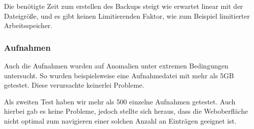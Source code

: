 Die benötigte Zeit zum erstellen des Backups steigt wie erwartet linear mit der Dateigröße, und es gibt keinen Limitierenden Faktor, wie zum Beispiel limitierter Arbeitsspeicher.

\subsubsection{Aufnahmen}
Auch die Aufnahmen wurden auf Anomalien unter extremen Bedingungen untersucht.\newline 
So wurden beispielsweise eine Aufnahmedatei mit mehr als 5GB getestet. Diese verursachte keinerlei Probleme.\newline

Als zweiten Test haben wir mehr als 500 einzelne Aufnahmen getestet. Auch hierbei gab es keine Probleme, jedoch stellte sich heraus, dass die Weboberfläche nicht optimal zum navigieren einer solchen Anzahl an Einträgen geeignet ist.


